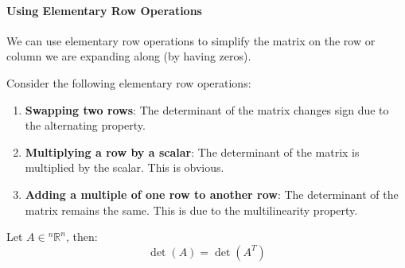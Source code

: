 \documentclass[11pt]{report}
\begin{document}
\paragraph{Using Elementary Row Operations} We can use elementary row operations to simplify the matrix on the row or column we are expanding along (by having zeros).
\begin{theorem}
    Consider the following elementary row operations:
    \begin{enumerate}
        \item \textbf{Swapping two rows}: The determinant of the matrix changes sign due to the alternating property.
        \item \textbf{Multiplying a row by a scalar}: The determinant of the matrix is multiplied by the scalar. This is obvious.
        \item \textbf{Adding a multiple of one row to another row}: The determinant of the matrix remains the same. This is due to the multilinearity property.
    \end{enumerate}
\end{theorem}
\begin{theorem}
    Let $A \in  {^n\mathbb{R}^n}$, then:
    \begin{equation}
        \det(A) = \det(A^T)
    \end{equation}
\end{theorem}
\end{document}
